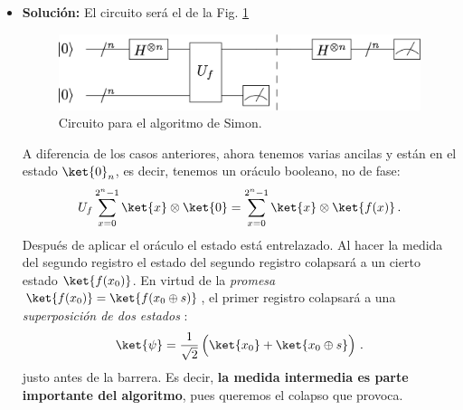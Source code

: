 \documentclass[a4paper,11pt]{book} %
\numberwithin{equation}{chapter}
\begin{document}
\begin{itemize}
	\item \textbf{Solución:} El circuito será el de la Fig. \ref{Fig_algoritmos_SimonCircuit}
	
		\begin{figure}[H]
			\centering 
			\includegraphics[width=0.6\linewidth]{Figuras/Fig_algoritmos_SimonCircuit.png}
			\caption{Circuito para el algoritmo de Simon.}
			\label{Fig_algoritmos_SimonCircuit}
			\end{figure}	
	
	A diferencia de los casos anteriores, ahora tenemos varias ancilas y están en el estado $\ket{0}_n$, es decir, tenemos un oráculo booleano, no de fase:
	\begin{equation}
	U_f \sum_{x=0}^{2^n-1}\ket{x}\otimes \ket{0}  = \sum_{x=0}^{2^n-1}\ket{x}\otimes \ket{f(x)} \,.
	\end{equation}
	Después de aplicar el oráculo el estado está entrelazado. Al hacer la medida del segundo registro  el estado del segundo registro colapsará a un cierto estado $\ket{f(x_0)}$. En virtud de la \textit{promesa }$\ket{f(x_0)} = \ket{f(x_0\oplus s)}$, el primer registro colapsará a una \textit{superposición de dos estados} :
	\begin{equation}
	\ket{\psi} = \frac{1}{\sqrt{2}} \left( \rule{0mm}{4mm} \ket{x_0} + \ket{x_0 \oplus s} \right) \,.
	\end{equation}
	justo antes de la barrera. Es decir, \textbf{la medida intermedia es parte importante del algoritmo}, pues queremos el colapso que provoca. 
	

\end{itemize}
\end{document}
